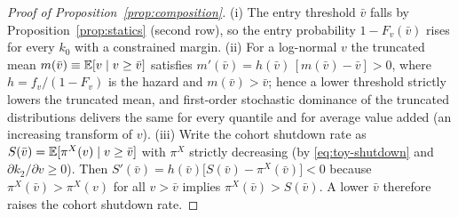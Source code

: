 \documentclass[12pt]{article}
\begin{document}
\begin{proof}[Proof of Proposition~\ref{prop:composition}]
(i) The entry threshold $\bar v$ falls by
Proposition~\ref{prop:statics} (second row), so the entry probability
$1-F_{v}(\bar v)$ rises for every $k_{0}$ with a constrained margin.
(ii) For a log-normal $v$ the truncated mean
$m(\bar v)\equiv\mathbb{E}[v\mid v\geq\bar v]$ satisfies
$m'(\bar v)=h(\bar v)\,[m(\bar v)-\bar v]>0$, where
$h=f_{v}/(1-F_{v})$ is the hazard and $m(\bar v)>\bar v$; hence a lower
threshold strictly lowers the truncated mean, and first-order
stochastic dominance of the truncated distributions delivers the same
for every quantile and for average value added (an increasing transform
of $v$). (iii) Write the cohort shutdown rate as
$S(\bar v)=\mathbb{E}[\pi^{X}(v)\mid v\geq\bar v]$ with $\pi^{X}$ strictly
decreasing (by \eqref{eq:toy-shutdown} and
$\partial k_{2}/\partial v\geq0$). Then
$S'(\bar v)=h(\bar v)\big[S(\bar v)-\pi^{X}(\bar v)\big]<0$ because
$\pi^{X}(\bar v)>\pi^{X}(v)$ for all $v>\bar v$ implies
$\pi^{X}(\bar v)>S(\bar v)$. A lower $\bar v$ therefore raises the
cohort shutdown rate.
\end{proof}
\end{document}
